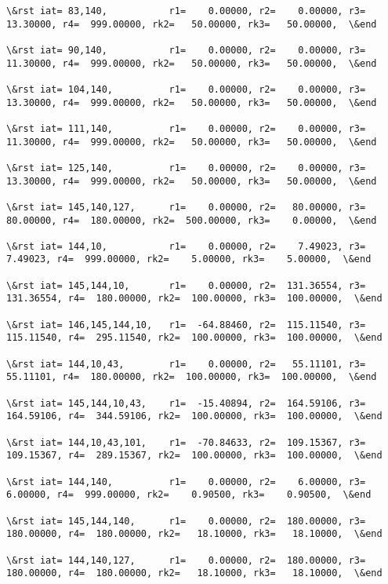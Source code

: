 \documentclass[11pt]{article}
\begin{document}
\begin{Verbatim}[commandchars=\\\{\}]
\&rst iat= 83,140,           r1=    0.00000, r2=    0.00000, r3=   13.30000, r4=  999.00000, rk2=   50.00000, rk3=   50.00000,  \&end

\&rst iat= 90,140,           r1=    0.00000, r2=    0.00000, r3=   11.30000, r4=  999.00000, rk2=   50.00000, rk3=   50.00000,  \&end

\&rst iat= 104,140,          r1=    0.00000, r2=    0.00000, r3=   13.30000, r4=  999.00000, rk2=   50.00000, rk3=   50.00000,  \&end

\&rst iat= 111,140,          r1=    0.00000, r2=    0.00000, r3=   11.30000, r4=  999.00000, rk2=   50.00000, rk3=   50.00000,  \&end

\&rst iat= 125,140,          r1=    0.00000, r2=    0.00000, r3=   13.30000, r4=  999.00000, rk2=   50.00000, rk3=   50.00000,  \&end

\&rst iat= 145,140,127,      r1=    0.00000, r2=   80.00000, r3=   80.00000, r4=  180.00000, rk2=  500.00000, rk3=    0.00000,  \&end

\&rst iat= 144,10,           r1=    0.00000, r2=    7.49023, r3=    7.49023, r4=  999.00000, rk2=    5.00000, rk3=    5.00000,  \&end

\&rst iat= 145,144,10,       r1=    0.00000, r2=  131.36554, r3=  131.36554, r4=  180.00000, rk2=  100.00000, rk3=  100.00000,  \&end

\&rst iat= 146,145,144,10,   r1=  -64.88460, r2=  115.11540, r3=  115.11540, r4=  295.11540, rk2=  100.00000, rk3=  100.00000,  \&end

\&rst iat= 144,10,43,        r1=    0.00000, r2=   55.11101, r3=   55.11101, r4=  180.00000, rk2=  100.00000, rk3=  100.00000,  \&end

\&rst iat= 145,144,10,43,    r1=  -15.40894, r2=  164.59106, r3=  164.59106, r4=  344.59106, rk2=  100.00000, rk3=  100.00000,  \&end

\&rst iat= 144,10,43,101,    r1=  -70.84633, r2=  109.15367, r3=  109.15367, r4=  289.15367, rk2=  100.00000, rk3=  100.00000,  \&end

\&rst iat= 144,140,          r1=    0.00000, r2=    6.00000, r3=    6.00000, r4=  999.00000, rk2=    0.90500, rk3=    0.90500,  \&end

\&rst iat= 145,144,140,      r1=    0.00000, r2=  180.00000, r3=  180.00000, r4=  180.00000, rk2=   18.10000, rk3=   18.10000,  \&end

\&rst iat= 144,140,127,      r1=    0.00000, r2=  180.00000, r3=  180.00000, r4=  180.00000, rk2=   18.10000, rk3=   18.10000,  \&end


\end{Verbatim}
\end{document}
